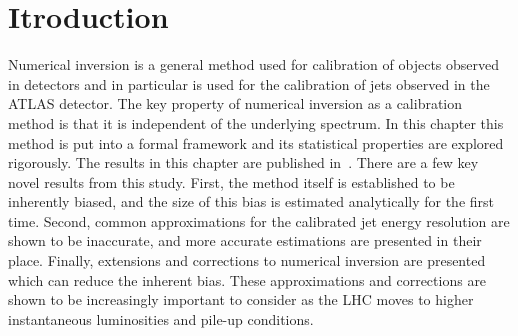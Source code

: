 \section{Itroduction}
Numerical inversion is a general method used for calibration of objects observed in detectors and in particular is used for the calibration of jets observed in the ATLAS detector.
The key property of numerical inversion as a calibration method is that it is independent of the underlying spectrum.
In this chapter this method is put into a formal framework and its statistical properties are explored rigorously.
The results in this chapter are published in~\cite{Cukierman:2016dkb}.
There are a few key novel results from this study.
First, the method itself is established to be inherently biased, and the size of this bias is estimated analytically for the first time.
Second, common approximations for the calibrated jet energy resolution are shown to be inaccurate, and more accurate estimations are presented in their place. 
Finally, extensions and corrections to numerical inversion are presented which can reduce the inherent bias.
These approximations and corrections are shown to be increasingly important to consider as the LHC moves to higher instantaneous luminosities and pile-up conditions.


